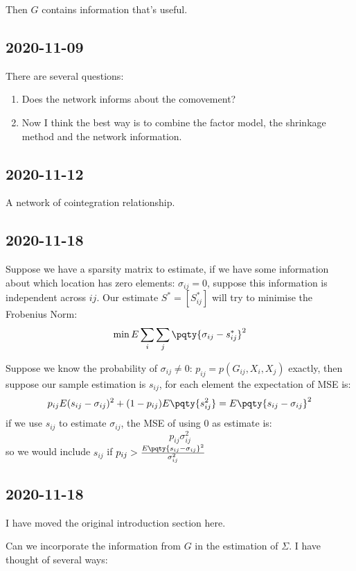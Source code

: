 Then \(G\) contains information that's useful.
\subsection{2020-11-09}
There are several questions:
\begin{enumerate}
    \item Does the network informs about the comovement?
    \item Now I think the best way is to combine the factor model, the shrinkage method and the network information. 
\end{enumerate}

\subsection{2020-11-12}

A network of cointegration relationship. 

\subsection{2020-11-18}
    Suppose we have a sparsity matrix to estimate, if we have some information about which location has zero elements: \(\sigma_{ij} = 0\), suppose this information is independent across \(ij\). Our estimate \(S^{*} = [S^{*}_{ij}]\) will try to minimise the Frobenius Norm: 
    \begin{equation*}
        \min E \sum_{i}\sum_{j} \pqty{\sigma_{ij} - s^{*}_{ij}}^{2}
    \end{equation*}
    
    Suppose we know the probability of \(\sigma_{ij} \neq 0\): \(p_{ij} = p(G_{ij}, X_{i}, X_{j})\) exactly, then suppose our sample estimation is \(s_{ij}\), for each element the expectation of MSE is:
    \begin{equation*}
        p_{ij} E (s_{ij} - \sigma_{ij})^{2} + (1-p_{ij}) E \pqty{s_{ij}^{2}} = E\pqty{s_{ij} - \sigma_{ij}}^{2}
    \end{equation*}
    if we use \(s_{ij}\) to estimate \(\sigma_{ij}\), the MSE of using \(0\) as estimate is:
    \begin{equation*}
        p_{ij} \sigma^{2}_{ij} 
    \end{equation*}
    so we would include \(s_{ij}\) if \(p_{ij}> \frac{E\pqty{s_{ij} - \sigma_{ij}}^{2}}{\sigma^{2}_{ij}}\)
    
    \subsection{2020-11-18}
    I have moved the original introduction section here. 
    \begin{question}
        Can we incorporate the information from \(G\) in the estimation of \(\Sigma\). I have thought of several ways:
    \end{question}


